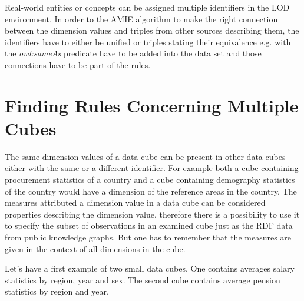 Real-world entities or concepts can be assigned multiple identifiers in the LOD environment. In order to the AMIE algorithm to make the right connection between the dimension values and triples from other sources describing them, the identifiers have to either be unified or triples stating their equivalence e.g. with the \textit{owl:sameAs} predicate have to be added into the data set and those connections have to be part of the rules.

\section{Finding Rules Concerning Multiple Cubes}

The same dimension values of a data cube can be present in other data cubes either with the same or a different identifier. For example both a cube containing procurement statistics of a country and a cube containing demography statistics of the country would have a dimension of the reference areas in the country. The measures attributed a dimension value in a data cube can be considered properties describing the dimension value, therefore there is a possibility to use it to specify the subset of observations in an examined cube just as the RDF data from public knowledge graphs. But one has to remember that the measures are given in the context of all dimensions in the cube. 

Let's have a first example of two small data cubes. One contains averages salary statistics by region, year and sex. The second cube contains average pension statistics by region and year.

